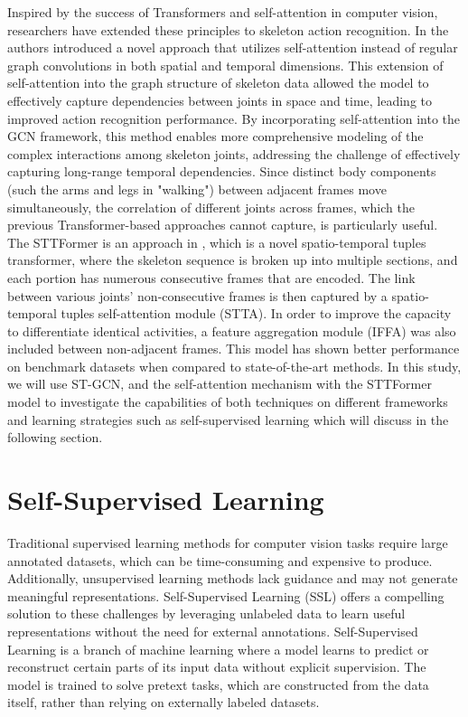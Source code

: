 Inspired by the success of Transformers and self-attention in computer vision, researchers have extended these principles to skeleton action recognition. In \cite{plizzari2021skeleton} the authors introduced a novel approach that utilizes self-attention instead of regular graph convolutions in both spatial and temporal dimensions. This extension of self-attention into the graph structure of skeleton data allowed the model to effectively capture dependencies between joints in space and time, leading to improved action recognition performance. By incorporating self-attention into the GCN framework, this method enables more comprehensive modeling of the complex interactions among skeleton joints, addressing the challenge of effectively capturing long-range temporal dependencies. Since distinct body components (such the arms and legs in "walking") between adjacent frames move simultaneously, the correlation of different joints across frames, which the previous Transformer-based approaches cannot capture, is particularly useful. The STTFormer is an approach in \cite{qiu2022spatio}, which is a novel spatio-temporal tuples transformer, where the skeleton sequence is broken up into multiple sections, and each portion has numerous consecutive frames that are encoded. The link between various joints' non-consecutive frames is then captured by a spatio-temporal tuples self-attention module (STTA). In order to improve the capacity to differentiate identical activities, a feature aggregation module (IFFA) was also included between non-adjacent frames. This model has shown better performance on benchmark datasets when compared to state-of-the-art methods. In this study, we will use ST-GCN, and the self-attention mechanism with the STTFormer model to investigate the capabilities of both techniques on different frameworks and learning strategies such as self-supervised learning which will discuss in the following section.

\section{Self-Supervised Learning}
Traditional supervised learning methods for computer vision tasks require large annotated datasets, which can be time-consuming and expensive to produce. Additionally, unsupervised learning methods lack guidance and may not generate meaningful representations. Self-Supervised Learning (SSL) offers a compelling solution to these challenges by leveraging unlabeled data to learn useful representations without the need for external annotations. Self-Supervised Learning is a branch of machine learning where a model learns to predict or reconstruct certain parts of its input data without explicit supervision. The model is trained to solve pretext tasks, which are constructed from the data itself, rather than relying on externally labeled datasets.

